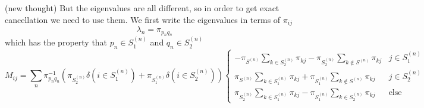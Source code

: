 \documentclass[a4paper]{article}
\begin{document}
(new thought) But the eigenvalues are all different, so in order to get exact cancellation we need to use them.  We first write 
the eigenvalues in terms of $\pi_{ij}$
\begin{equation}
\lambda_n = \pi_{p_n q_n}
\end{equation}
which has the property that $p_n \in S_1^{(n)}$ and $q_n \in S_2^{(n)}$
\begin{equation}
M_{ij} = \sum_n \pi_{p_n q_n}^{-1} 
\left( \pi_{S_2^{(n)}} \delta \left(i \in S_1^{(n)}\right) 
+ \pi_{S_1^{(n)}} \delta \left(i  \in S_2^{(n)}\right) 
\right)
\begin{cases}
-\pi_{S^{(n)}}
\sum_{k \in S_2^{(n)}}  \pi_{kj}
-\pi_{S_2^{(n)}}
\sum_{k \notin S^{(n)}} \pi_{kj}
 & j \in S_1^{(n)} \\
\pi_{S^{(n)}}
\sum_{k \in S_1^{(n)}}  \pi_{kj}
+ \pi_{S_1^{(n)}}
\sum_{k \notin S^{(n)}} \pi_{kj}
& j \in S_2^{(n)} \\
\pi_{S_2^{(n)}} \sum_{k \in S_1^{(n)}}  \pi_{kj}
- 
\pi_{S_1^{(n)}} \sum_{k \in S_2^{(n)}}  \pi_{kj}
& \text{else}
\end{cases}
\end{equation}
\end{document}
